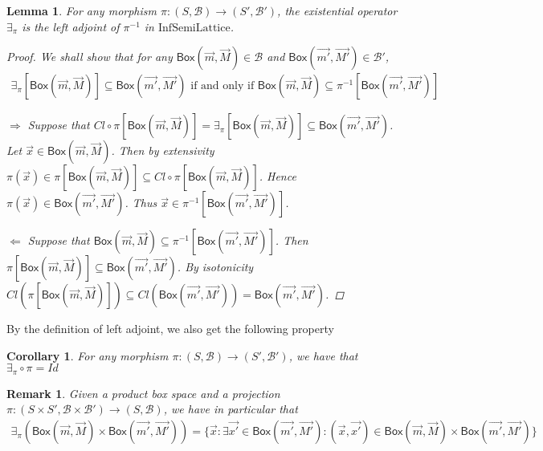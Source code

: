 \documentclass[12pt]{article}
\newtheorem{lemma}[theorem]{Lemma}
\newtheorem{corollary}[theorem]{Corollary}
\newtheorem{remark}[theorem]{Remark}
\newcommand{\InfSemiLattice}{\text{InfSemiLattice}}
\newcommand{\bobject}{\mathsf{Box}}
\begin{document}
\begin{lemma}
    For any morphism $\pi:(S,\mathcal{B})\to(S',\mathcal{B}')$,
    the existential operator $\exists_\pi$ is the left adjoint of $\pi^{-1}$ in $\InfSemiLattice$.
    \begin{proof}
        We shall show that for any $\bobject(\vec{m},\vec{M})\in\mathcal{B}$ and $\bobject(\vec{m'},\vec{M'})\in\mathcal{B}'$,
        \begin{gather*}
            \exists_\pi[\bobject(\vec{m},\vec{M})]\subseteq \bobject(\vec{m'},\vec{M'})\text{ if and only if }
            \bobject(\vec{m},\vec{M})\subseteq \pi^{-1}[\bobject(\vec{m'},\vec{M'})]
        \end{gather*}
        \par $\Rightarrow$ Suppose that $Cl\circ \pi[\bobject(\vec{m},\vec{M})]=\exists_\pi[\bobject(\vec{m},\vec{M})]\subseteq \bobject(\vec{m'},\vec{M'})$.
        Let $\vec{x}\in\bobject(\vec{m},\vec{M})$.
        Then by extensivity $\pi(\vec{x})\in\pi[\bobject(\vec{m},\vec{M})]\subseteq Cl\circ \pi[\bobject(\vec{m},\vec{M})]$.
        Hence $\pi(\vec{x})\in\bobject(\vec{m'},\vec{M'})$. Thus $\vec{x}\in\pi^{-1}[\bobject(\vec{m'},\vec{M'})]$.
        \par $\Leftarrow$ Suppose that $\bobject(\vec{m},\vec{M})\subseteq \pi^{-1}[\bobject(\vec{m'},\vec{M'})]$.
        Then $\pi[\bobject(\vec{m},\vec{M})]\subseteq\bobject(\vec{m'},\vec{M'})$.
        By isotonicity $Cl(\pi[\bobject(\vec{m},\vec{M})])\subseteq Cl(\bobject(\vec{m'},\vec{M'}))=\bobject(\vec{m'},\vec{M'})$.
    \end{proof}
\end{lemma}
By the definition of left adjoint, we also get the following property
\begin{corollary}\label{cor:adjoint}
    For any morphism $\pi:(S,\mathcal{B})\to(S',\mathcal{B}')$,
    we have that $\exists_\pi\circ\pi=Id$
\end{corollary}
\begin{remark}
    Given a product box space and a projection $\pi:(S\times S',\mathcal{B}\times\mathcal{B}')\to(S,\mathcal{B})$,
    we have in particular that
    \begin{gather*}
        \exists_\pi(\bobject(\vec{m},\vec{M})\times\bobject(\vec{m'},\vec{M'}))=
        \{\vec{x}:\exists \vec{x'}\in \bobject(\vec{m'},\vec{M'}):(\vec{x},\vec{x'})
        \in \bobject(\vec{m},\vec{M})\times\bobject(\vec{m'},\vec{M'})
        \}
    \end{gather*}
\end{remark}
\end{document}
